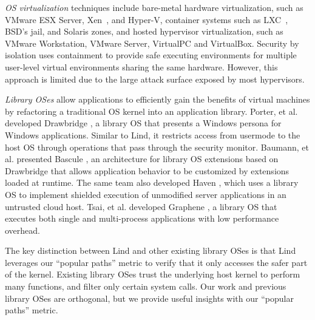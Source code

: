 \textit{OS virtualization}
techniques include
bare-metal hardware virtualization, such as VMware ESX Server, Xen~\cite{Xen-03},
and Hyper-V, container systems such as LXC~\cite{LXC}, BSD's jail, and Solaris zones, and
hosted hypervisor virtualization, such as VMware
Workstation, VMware Server, VirtualPC and VirtualBox.
Security by isolation \cite{Qubes, Overshadow, SecureVM, HypSec}
uses containment to provide safe executing environments for multiple
user-level virtual environments sharing the same hardware.
However, this approach is limited due to
the large attack surface exposed by most hypervisors.

\textit{Library OSes}
allow applications to efficiently gain the benefits of virtual machines
by refactoring a traditional OS kernel into an application library.
Porter, et al. developed Drawbridge \cite{Drawbridge-11},
a library OS
that presents a Windows persona for %
Windows applications. Similar to Lind,
it restricts access from usermode to the host OS through
operations that pass through the security monitor.
%
%
Baumann, et al. presented Bascule \cite{Bascule}, an architecture for library OS extensions
based on Drawbridge that allows application behavior to be customized by
extensions loaded at runtime. The same team also developed Haven \cite{Haven},
which uses a library OS to implement
shielded execution of unmodified server applications
in an untrusted cloud host.
Tsai, et al. developed Graphene \cite{Graphene-14}, a library OS that
executes both single and
multi-process applications with low performance overhead.

The key distinction between Lind and other existing library OSes is that
Lind leverages our ``popular paths'' metric to verify that it only accesses the
safer part of the kernel.
Existing library OSes trust the underlying host kernel to perform many functions,
and filter only certain system calls.
Our work and previous library OSes are orthogonal, but we provide useful insights with our ``popular paths'' metric.
